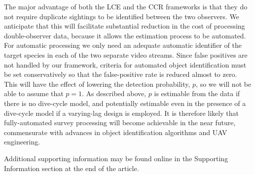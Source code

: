 \documentclass[useAMS, usenatbib, referee]{biom}\usepackage[]{graphicx}\usepackage[]{color}
\begin{document}

The major advantage of both the LCE and the CCR frameworks is that they do not require duplicate sightings to be identified between the two observers. We anticipate that this will facilitate substantial reduction in the cost of processing double-observer data, because it allows the estimation process to be automated. For automatic processing we only need an adequate automatic identifier of the target species in each of the two separate video streams. Since false positives are not handled by our framework, criteria for automated object identification must be set conservatively so that the false-positive rate is reduced almost to zero. This will have the effect of lowering the detection probability, $p$, so we will not be able to assume that $p=1$. As described above, $p$ is estimable from the data if there is no dive-cycle model, and potentially estimable even in the presence of a dive-cycle model if a varying-lag design is employed. It is therefore likely that fully-automated survey processing will become achievable in the near future, commensurate with advances in object identification algorithms and UAV engineering.



Additional supporting information may be found online in the Supporting Information section at the end of the article.
\end{document}
